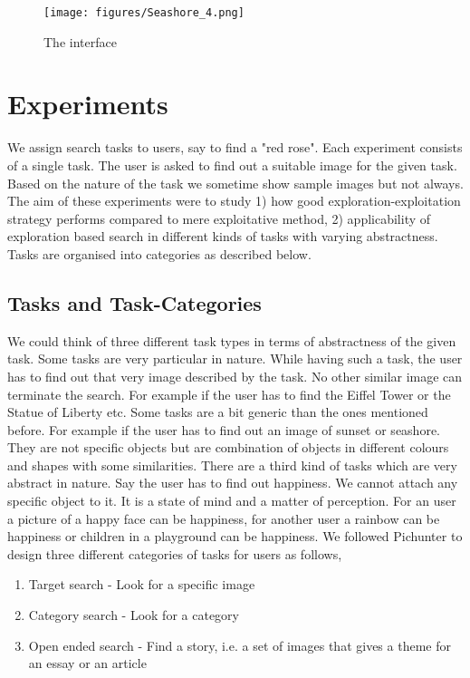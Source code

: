 \documentclass[english]{tktltiki}
\begin{document}
\begin{figure}[h!]
  \centering
    \texttt{[image: figures/Seashore\_4.png]}
    \caption{The interface}
    \label{fig:sample_interface}
\end{figure}

\section{Experiments}

We assign search tasks to users, say to find a "red rose". Each experiment consists of a single task. The user is asked to find out a suitable image for the given task. Based on the nature of the task we sometime show sample images but not always. The aim of these experiments were to study 1) how good exploration-exploitation strategy performs compared to mere exploitative method, 2) applicability of exploration based search in different kinds of tasks with varying abstractness. Tasks are organised into categories as described below.

\subsection{Tasks and Task-Categories}

 We could think of three different task types in terms of abstractness of the given task. Some tasks are very particular in nature. While having such a task, the user has to find out that very image described by the task. No other similar image can terminate the search. For example if the user has to find the Eiffel Tower or the Statue of Liberty etc. Some tasks are a bit generic than the ones mentioned before. For example if the user has to find out an image of sunset or seashore. They are not specific objects but are combination of objects in different colours and shapes with some similarities. There are a third kind of tasks which are very abstract in nature. Say the user has to find out happiness. We cannot attach any specific object to it. It is a state of mind and a matter of perception. For an user a picture of a happy face can be happiness, for another user a rainbow can be happiness or children in a playground can be happiness. We followed Pichunter \cite{pichunter} to design three different categories of tasks for users as follows,

\begin{enumerate}
  \item Target search - Look for a specific image
  \item Category search - Look for a category
  \item Open ended search - Find a story, i.e. a set of images that gives a theme for an essay or an article
\end{enumerate}
\end{document}
